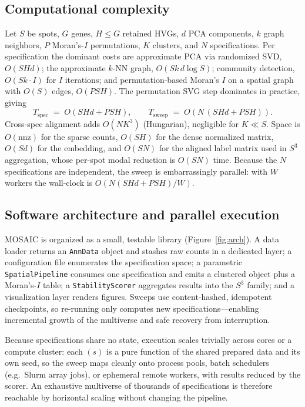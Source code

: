 \subsection{Computational complexity}
\label{sec:complexity}
Let $S$ be spots, $G$ genes, $H \le G$ retained HVGs, $d$ PCA components, $k$ graph
neighbors, $P$ Moran's-$I$ permutations, $K$ clusters, and $N$ specifications. Per
specification the dominant costs are approximate PCA via randomized SVD, $O(SHd)$; the
approximate $k$-NN graph, $O\!\left(Sk\,d \log S\right)$; community detection, $O(Sk\cdot I)$
for $I$ iterations; and permutation-based Moran's $I$ on a spatial graph with $O(S)$ edges,
$O(PSH)$. The permutation SVG step dominates in practice, giving
\begin{equation}
  T_{\text{spec}} \;=\; O\!\left(SHd + PSH\right), \qquad
  T_{\text{sweep}} \;=\; O\!\left(N\,(SHd + PSH)\right).
\end{equation}
Cross-spec alignment adds $O(N K^3)$ (Hungarian), negligible for $K \ll S$. Space is
$O(\mathrm{nnz})$ for the sparse counts, $O(SH)$ for the dense normalized matrix, $O(Sd)$ for
the embedding, and $O(SN)$ for the aligned label matrix used in $S^3$ aggregation, whose
per-spot modal reduction is $O(SN)$ time. Because the $N$ specifications are independent, the
sweep is embarrassingly parallel: with $W$ workers the wall-clock is
$O\!\left(N(SHd + PSH)/W\right)$.

\subsection{Software architecture and parallel execution}
\label{sec:arch}
MOSAIC is organized as a small, testable library (Figure~\ref{fig:arch}). A data loader
returns an {\tt AnnData} object and stashes raw counts in a dedicated layer; a
configuration file enumerates the specification space; a parametric \texttt{SpatialPipeline}
consumes one specification and emits a clustered object plus a Moran's-$I$ table; a
\texttt{StabilityScorer} aggregates results into the $S^3$ family; and a visualization layer
renders figures. Sweeps use content-hashed, idempotent checkpoints, so re-running only
computes new specifications---enabling incremental growth of the multiverse and safe
recovery from interruption.

Because specifications share no state, execution scales trivially across cores or a compute
cluster: each $(s)$ is a pure function of the shared prepared data and its own seed, so the
sweep maps cleanly onto process pools, batch schedulers (e.g.\ Slurm array jobs), or ephemeral
remote workers, with results reduced by the scorer. An exhaustive multiverse of thousands of
specifications is therefore reachable by horizontal scaling without changing the pipeline.

